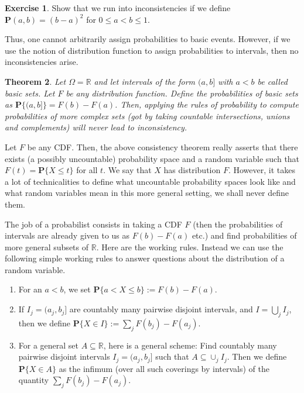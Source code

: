 \documentclass[preprint,  11pt]{amsart}
\theoremstyle{plain} %
\newtheorem{theorem}{Theorem}
\theoremstyle{definition} %
\newtheorem{exercise}[theorem]{Exercise}
\begin{document}
{\begin{exercise} Show that we run into inconsistencies if we define $\mathbf{P}(a,b)=(b-a)^{2}$ for $0\le a<b\le 1$.
\end{exercise}

Thus, one cannot arbitrarily assign probabilities to basic events. However, if we use the notion of distribution function to assign probabilities to intervals, then no inconsistencies arise.
\begin{theorem}\label{thm:consistencyofmeasures} Let $\Omega=\mathbb{R}$ and let intervals of the form $(a,b]$ with $a<b$ be called basic sets. Let $F$ be any distribution function. {\em Define} the probabilities of basic sets as $\mathbf{P}\{(a,b]\}=F(b)-F(a)$. Then, applying the rules of probability to compute probabilities of more complex sets (got by taking countable intersections, unions and complements) will never lead to inconsistency.
\end{theorem}
Let $F$ be any CDF. Then, the above consistency theorem really asserts that there exists (a possibly uncountable) probability space and a random variable such that $F(t)=\mathbf{P}\{X\le t\}$ for all $t$. We say that $X$ has distribution $F$. However, it takes a lot of technicalities to define what uncountable probability spaces look like and what random variables mean in this more general setting, we shall never define them. 

The job of a probabilist consists in taking a CDF $F$ (then the probabilities of intervals are already given to us as $F(b)-F(a)$ etc.) and find probabilities of more general subsets of $\mathbb{R}$. Here are the working rules.  Instead we can use the following simple working rules to answer questions about the distribution of a random variable.
\begin{enumerate}\setlength\itemsep{6pt}
\item For an $a<b$, we set $\mathbf{P}\{a<X\le b\}:=F(b)-F(a)$.
\item If $I_{j}=(a_{j},b_{j}]$ are countably many pairwise disjoint intervals, and $I=\bigcup_{j}I_{j}$, then we define $\mathbf{P}\{X\in I\}:=\sum_{j}F(b_{j})-F(a_{j})$.
\item For a general set $A\subseteq \mathbb{R}$, here is a general scheme: Find countably many pairwise disjoint intervals $I_{j}=(a_{j},b_{j}]$ such that $A\subseteq \cup_{j}I_{j}$. Then we define $\mathbf{P}\{X\in A\}$ as the infimum (over all such coverings by intervals) of the quantity $\sum_{j}F(b_{j})-F(a_{j})$. 
\end{enumerate}

}
\end{document}
